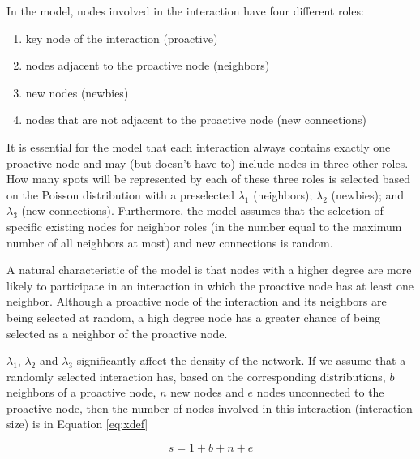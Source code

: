 In the model, nodes involved in the interaction have four different roles:

\begin{enumerate}
	\item key node of the interaction (proactive)
  \item nodes adjacent to the proactive node (neighbors)
  \item new nodes (newbies)
  \item nodes that are not adjacent to the proactive node (new connections)
\end{enumerate}

It is essential for the model that each interaction always contains exactly one proactive node and may (but doesn't have to) include nodes in three other roles. How many spots will be represented by each of these three roles is selected based on the Poisson distribution with a preselected $\lambda_1$ (neighbors); $\lambda_2$ (newbies); and $\lambda_3$ (new connections). Furthermore, the model assumes that the selection of specific existing nodes for neighbor roles (in the number equal to the maximum number of all neighbors at most) and new connections is random.



A natural characteristic of the model is that nodes with a higher degree are more likely to participate in an interaction in which the proactive node has at least one neighbor. Although a proactive node of the interaction and its neighbors are being selected at random, a high degree node has a greater chance of being selected as a neighbor of the proactive node.


$\lambda_1$, $\lambda_2$ and $\lambda_3$ significantly affect the density of the network. If we assume that a randomly selected interaction has, based on the corresponding distributions, $b$ neighbors of a proactive node, $n$ new nodes and $e$ nodes unconnected to the proactive node, then the number of nodes involved in this interaction (interaction size) is in Equation \ref{eq:xdef} 

\begin{equation} s = 1 + b + n + e \label{eq:xdef}
\end{equation}

